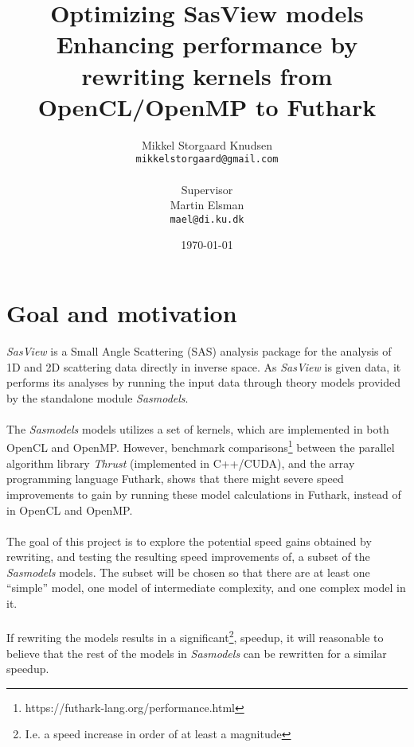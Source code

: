 \documentclass[11pt]{article}
\title{
  \vspace{3cm}
  \Huge{Optimizing SasView models} \\
  \Large{Enhancing performance by rewriting kernels from OpenCL/OpenMP to Futhark}
}
\author{
  \Large{Mikkel Storgaard Knudsen}
  \\ \texttt{mikkelstorgaard@gmail.com} \\
  \\
  \Large{Supervisor}
  \\ Martin Elsman
  \\ \texttt{mael@di.ku.dk} \\
}
\date{
    \today
}
\def \ColourPDF {include/ku-farve}
\def \TitlePDF   {include/ku-en}  %
\begin{document}


\clearpage\maketitle
\thispagestyle{empty}

\newpage

\section*{Goal and motivation}
\textit{SasView} is a Small Angle Scattering (SAS) analysis package for the analysis of
1D and 2D scattering data directly in inverse space.
As \textit{SasView} is given data, it performs its analyses by running the input data
through theory models provided by the standalone module \textit{Sasmodels}.
\\
\\
The \textit{Sasmodels} models utilizes a set of kernels, which are implemented
in both OpenCL and OpenMP.
However, benchmark
comparisons\footnote{https://futhark-lang.org/performance.html} between the
parallel algorithm library \textit{Thrust} (implemented in C++/CUDA), and the
array programming language Futhark, shows that there might severe speed
improvements to gain by running these model calculations in Futhark, instead
of in OpenCL and OpenMP.
\\
\\
The goal of this project is to explore the potential speed gains obtained by
rewriting, and testing the resulting speed improvements of, a subset of the
\textit{Sasmodels} models.
The subset will be chosen so that there are at least
one ``simple'' model, one model of intermediate complexity, and one complex
model in it.
\\
\\
If rewriting the models results in a significant\footnote{I.e. a speed increase
  in order of at least a magnitude}, speedup, it will reasonable to believe that the
rest of the models in \textit{Sasmodels} can be rewritten for a similar speedup.
\end{document}
